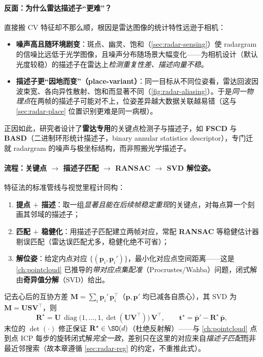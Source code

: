 \paragraph{反面：为什么雷达描述子“更难”？}
直接搬 CV 特征却不那么顺，根因是雷达图像的统计特性远逊于相机\cite{carlone2026handbook}：
\begin{itemize}
  \item \textbf{噪声高且随环境剧变}：斑点、幽灵、饱和（\cref{sec:radar-sensing}）使 radargram 的信噪比远低于光学图像，且噪声分布随场景大幅变化——为相机设计（默认光度较稳）的描述子在雷达上\emph{检测重复性差、描述向量不稳}。
  \item \textbf{描述子更“因地而变”（place-variant）}：同一目标从不同位姿看，雷达回波因波束宽、各向异性散射、饱和而显著不同（\cref{fig:radar-aliasing}）。于是\emph{同一物理点}在两帧的描述子可能对不上，位姿差异越大数据关联越易错（这与 \cref{sec:radar-place} 位置识别更难是同一病根）。
\end{itemize}
正因如此，研究者设计了\textbf{雷达专用}的关键点检测子与描述子，如 \textbf{FSCD} 与 \textbf{BASD}（二进制环形统计描述子，binary annular statistics descriptor），专门迁就 radargram 的噪声与极坐标结构，而非照搬光学描述子。

\paragraph{流程：关键点 $\to$ 描述子匹配 $\to$ RANSAC $\to$ SVD 解位姿。}
特征法的标准管线与视觉里程计同构\cite{carlone2026handbook}：
\begin{enumerate}
  \item \textbf{提点 $+$ 描述}：取一组\emph{显著且能在后续帧稳定重现}的关键点，对每点算一个刻画其邻域的描述子；
  \item \textbf{匹配 $+$ 稳健化}：用描述子匹配建立两帧对应，常配 \textbf{RANSAC} 等稳健估计器剔误匹配（雷达误匹配尤多，稳健化绝不可省）；
  \item \textbf{解位姿}：给定内点对应 $\{(\mathbf p_i,\mathbf p_i')\}$，最小化对应点空间距离——这是 \cref{ch:pointcloud} 已推导的\emph{带对应点集配准}（Procrustes/Wahba）问题，闭式解由\textbf{奇异值分解}（SVD）给出。
\end{enumerate}
记去心后的互协方差 $\mathbf M=\sum_i \mathbf p_i'\,\mathbf p_i^\top$（$\mathbf p,\mathbf p'$ 均已减各自质心），其 SVD 为 $\mathbf M=\mathbf U\mathbf S\mathbf V^\top$，则
\begin{equation}
  \mathbf R^\star=\mathbf U\,\operatorname{diag}\!\bigl(1,\dots,1,\det(\mathbf U\mathbf V^\top)\bigr)\,\mathbf V^\top,
  \qquad
  \mathbf t^\star=\bar{\mathbf p}'-\mathbf R^\star\,\bar{\mathbf p},
  \label{eq:radar-feature-svd}
\end{equation}
末位的 $\det(\cdot)$ 修正保证 $\mathbf R^\star\in\SO(d)$（杜绝反射解）——与 \cref{ch:pointcloud} 点到点 ICP 每步的旋转闭式解\emph{完全一致}，差别只在这里的对应来自\emph{描述子匹配}而非最近邻搜索（故本章遵循 \cref{sec:radar-reg} 的约定，不重推此式）。

